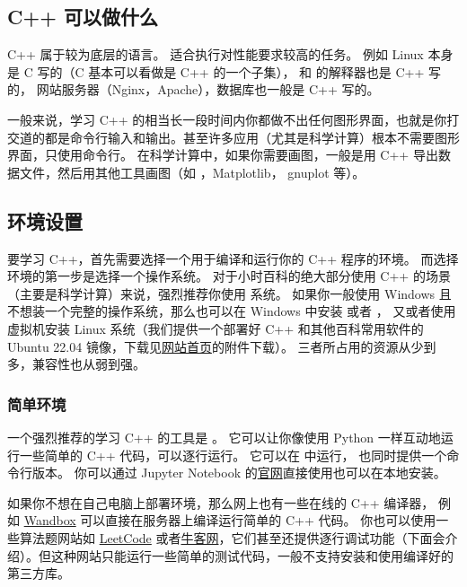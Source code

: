 

\begin{issues}
\issueDraft
\end{issues}

\subsection{C++ 可以做什么}
C++ 属于较为底层的语言。 适合执行对性能要求较高的任务。 例如 Linux 本身是 C 写的（C 基本可以看做是 C++ 的一个子集），  和  的解释器也是 C++ 写的， 网站服务器（Nginx，Apache），数据库也一般是 C++ 写的。

一般来说，学习 C++ 的相当长一段时间内你都做不出任何图形界面，也就是你打交道的都是命令行输入和输出。甚至许多应用（尤其是科学计算）根本不需要图形界面，只使用命令行。 在科学计算中，如果你需要画图，一般是用 C++ 导出数据文件，然后用其他工具画图（如 ，Matplotlib， gnuplot 等）。

\subsection{环境设置}

要学习 C++，首先需要选择一个用于编译和运行你的 C++ 程序的环境。 而选择环境的第一步是选择一个操作系统。 对于小时百科的绝大部分使用 C++ 的场景（主要是科学计算）来说，强烈推荐你使用  系统。 如果你一般使用 Windows 且不想装一个完整的操作系统，那么也可以在 Windows 中安装  或者 ， 又或者使用  虚拟机安装 Linux 系统（我们提供一个部署好 C++ 和其他百科常用软件的 Ubuntu 22.04 镜像，下载见\href{https://wuli.wiki}{网站首页}的附件下载）。 三者所占用的资源从少到多，兼容性也从弱到强。

\subsubsection{简单环境}
一个强烈推荐的学习 C++ 的工具是 。 它可以让你像使用 Python 一样互动地运行一些简单的 C++ 代码，可以逐行运行。 它可以在  中运行， 也同时提供一个命令行版本。 你可以通过 Jupyter Notebook 的\href{https://jupyter.org/}{官网}直接使用也可以在本地安装。

如果你不想在自己电脑上部署环境，那么网上也有一些在线的 C++ 编译器， 例如 \href{https://wandbox.org/}{Wandbox} 可以直接在服务器上编译运行简单的 C++ 代码。 你也可以使用一些算法题网站如 \href{https://leetcode.com/}{LeetCode} 或者\href{https://www.nowcoder.com/}{牛客网}，它们甚至还提供逐行调试功能（下面会介绍）。但这种网站只能运行一些简单的测试代码，一般不支持安装和使用编译好的第三方库。

